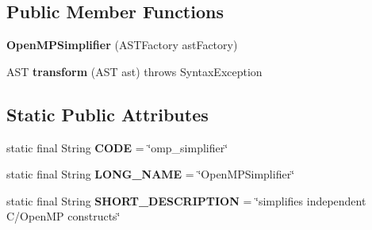 \subsection*{Public Member Functions}
\begin{DoxyCompactItemize}
\item 
\hypertarget{classedu_1_1udel_1_1cis_1_1vsl_1_1civl_1_1transform_1_1IF_1_1OpenMPSimplifier_a61891d4e1cc1f532beff557f14a5433b}{}{\bfseries Open\+M\+P\+Simplifier} (A\+S\+T\+Factory ast\+Factory)\label{classedu_1_1udel_1_1cis_1_1vsl_1_1civl_1_1transform_1_1IF_1_1OpenMPSimplifier_a61891d4e1cc1f532beff557f14a5433b}

\item 
\hypertarget{classedu_1_1udel_1_1cis_1_1vsl_1_1civl_1_1transform_1_1IF_1_1OpenMPSimplifier_ae89afd7656cccd501d800f599611dd90}{}A\+S\+T {\bfseries transform} (A\+S\+T ast)  throws Syntax\+Exception \label{classedu_1_1udel_1_1cis_1_1vsl_1_1civl_1_1transform_1_1IF_1_1OpenMPSimplifier_ae89afd7656cccd501d800f599611dd90}

\end{DoxyCompactItemize}
\subsection*{Static Public Attributes}
\begin{DoxyCompactItemize}
\item 
\hypertarget{classedu_1_1udel_1_1cis_1_1vsl_1_1civl_1_1transform_1_1IF_1_1OpenMPSimplifier_adaa06b7c6566977df08cd3d2f2399e07}{}static final String {\bfseries C\+O\+D\+E} = \char`\"{}omp\+\_\+simplifier\char`\"{}\label{classedu_1_1udel_1_1cis_1_1vsl_1_1civl_1_1transform_1_1IF_1_1OpenMPSimplifier_adaa06b7c6566977df08cd3d2f2399e07}

\item 
\hypertarget{classedu_1_1udel_1_1cis_1_1vsl_1_1civl_1_1transform_1_1IF_1_1OpenMPSimplifier_aff98c351fd2ed0ca9c23e82001572b01}{}static final String {\bfseries L\+O\+N\+G\+\_\+\+N\+A\+M\+E} = \char`\"{}Open\+M\+P\+Simplifier\char`\"{}\label{classedu_1_1udel_1_1cis_1_1vsl_1_1civl_1_1transform_1_1IF_1_1OpenMPSimplifier_aff98c351fd2ed0ca9c23e82001572b01}

\item 
\hypertarget{classedu_1_1udel_1_1cis_1_1vsl_1_1civl_1_1transform_1_1IF_1_1OpenMPSimplifier_a0f359ade4da0c5b5edc67a39d6e1c882}{}static final String {\bfseries S\+H\+O\+R\+T\+\_\+\+D\+E\+S\+C\+R\+I\+P\+T\+I\+O\+N} = \char`\"{}simplifies independent C/Open\+M\+P constructs\char`\"{}\label{classedu_1_1udel_1_1cis_1_1vsl_1_1civl_1_1transform_1_1IF_1_1OpenMPSimplifier_a0f359ade4da0c5b5edc67a39d6e1c882}

\end{DoxyCompactItemize}


